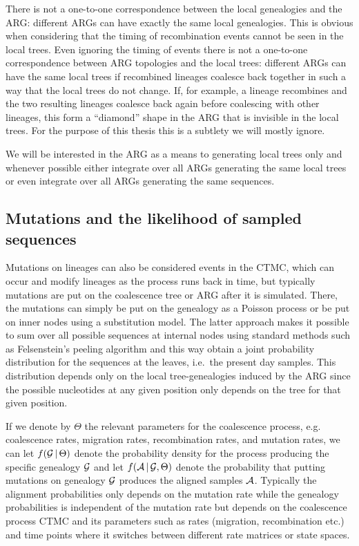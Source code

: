 There is not a one-to-one correspondence between the local genealogies and the ARG: different ARGs can have exactly the same local genealogies. This is obvious when considering that the timing of recombination events cannot be seen in the local trees. Even ignoring the timing of events there is not a one-to-one correspondence between ARG topologies and the local trees: different ARGs can have the same local trees if recombined lineages coalesce back together in such a way that the local trees do not change. If, for example, a lineage recombines and the two resulting lineages coalesce back again before coalescing with other lineages, this form a ``diamond'' shape in the ARG that is invisible in the local trees. For the purpose of this thesis this is a subtlety we will mostly ignore.

We will be interested in the ARG as a means to generating local trees only and whenever possible either integrate over all ARGs generating the same local trees or even integrate over all ARGs generating the same sequences.


\subsection{Mutations and the likelihood of sampled sequences}

Mutations on lineages can also be considered events in the CTMC, which can occur and modify lineages as the process runs back in time, but typically mutations are put on the coalescence tree or ARG after it is simulated. There, the mutations can simply be put on the genealogy as a Poisson process or be put on inner nodes using a substitution model. The latter approach makes it possible to sum over all possible sequences at internal nodes using standard methods such as Felsenstein's peeling algorithm \cite{Felsenstein_1981} and this way obtain a joint probability distribution for the sequences at the leaves, i.e.\ the present day samples. This distribution depends only on the local tree-genealogies induced by the ARG since the possible nucleotides at any given position only depends on the tree for that given position.

If we denote by $\Theta$ the relevant parameters for the coalescence process, e.g. coalescence rates, migration rates, recombination rates, and mutation rates, we can let $f(\mathcal{G}\,|\,\Theta)$ denote the probability density for the process producing the specific genealogy $\mathcal{G}$ and let $f(\mathcal{A}\,|\,\mathcal{G},\Theta)$ denote the probability that putting mutations on genealogy $\mathcal{G}$ produces the aligned samples $\mathcal{A}$. Typically the alignment probabilities only depends on the mutation rate while the genealogy probabilities is independent of the mutation rate but depends on the coalescence process CTMC and its parameters such as rates (migration, recombination etc.) and time points where it switches between different rate matrices or state spaces.

